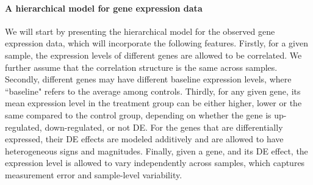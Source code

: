 	\paragraph{A hierarchical model for gene expression data}\label{subsection:YModel}
	We will start by presenting the hierarchical model for the observed gene expression data, which
	will incorporate the following features. Firstly, for a given sample, the expression levels of 
	different genes are allowed to be correlated. We further assume that the correlation structure 
	is the same across samples. Secondly, different genes may have different baseline expression 
	levels, where ``baseline" refers to the	average among controls. Thirdly, for any given gene, 
	its mean expression level in the treatment group can be either higher, lower or the same 
	compared to the control group, depending on whether the gene is up-regulated, down-regulated, 
	or not DE. For the genes that are differentially expressed, their DE effects are modeled 
	additively and are allowed to have heterogeneous signs and magnitudes. Finally, given a gene, 
	and its DE effect, the expression level is allowed to vary independently across samples, which 
	captures measurement error and sample-level variability.
	
